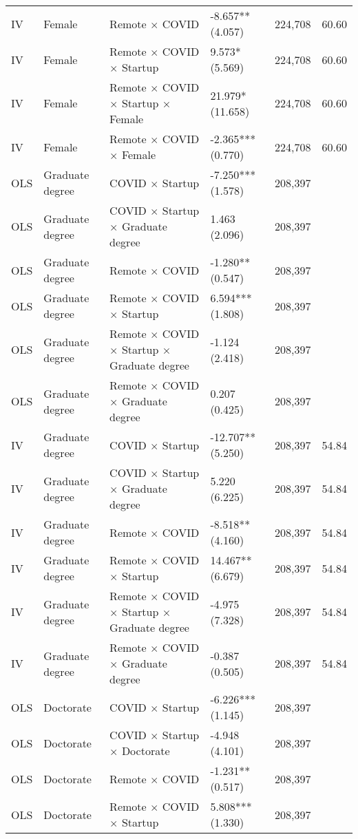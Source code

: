 \documentclass[11pt]{article}
\begin{document}
{\begin{longtable}{llllrr}
IV & Female & Remote $\times$ COVID & -8.657** (4.057) & 224,708 & 60.60 \\
IV & Female & Remote $\times$ COVID $\times$ Startup &  9.573* (5.569) & 224,708 & 60.60 \\
IV & Female & Remote $\times$ COVID $\times$ Startup × Female &  21.979* (11.658) & 224,708 & 60.60 \\
IV & Female & Remote $\times$ COVID × Female & -2.365*** (0.770) & 224,708 & 60.60 \\
OLS & Graduate degree & COVID $\times$ Startup & -7.250*** (1.578) & 208,397 &  \\
OLS & Graduate degree & COVID $\times$ Startup × Graduate degree &  1.463 (2.096) & 208,397 &  \\
OLS & Graduate degree & Remote $\times$ COVID & -1.280** (0.547) & 208,397 &  \\
OLS & Graduate degree & Remote $\times$ COVID $\times$ Startup &  6.594*** (1.808) & 208,397 &  \\
OLS & Graduate degree & Remote $\times$ COVID $\times$ Startup × Graduate degree & -1.124 (2.418) & 208,397 &  \\
OLS & Graduate degree & Remote $\times$ COVID × Graduate degree &  0.207 (0.425) & 208,397 &  \\
IV & Graduate degree & COVID $\times$ Startup & -12.707** (5.250) & 208,397 & 54.84 \\
IV & Graduate degree & COVID $\times$ Startup × Graduate degree &  5.220 (6.225) & 208,397 & 54.84 \\
IV & Graduate degree & Remote $\times$ COVID & -8.518** (4.160) & 208,397 & 54.84 \\
IV & Graduate degree & Remote $\times$ COVID $\times$ Startup &  14.467** (6.679) & 208,397 & 54.84 \\
IV & Graduate degree & Remote $\times$ COVID $\times$ Startup × Graduate degree & -4.975 (7.328) & 208,397 & 54.84 \\
IV & Graduate degree & Remote $\times$ COVID × Graduate degree & -0.387 (0.505) & 208,397 & 54.84 \\
OLS & Doctorate & COVID $\times$ Startup & -6.226*** (1.145) & 208,397 &  \\
OLS & Doctorate & COVID $\times$ Startup × Doctorate & -4.948 (4.101) & 208,397 &  \\
OLS & Doctorate & Remote $\times$ COVID & -1.231** (0.517) & 208,397 &  \\
OLS & Doctorate & Remote $\times$ COVID $\times$ Startup &  5.808*** (1.330) & 208,397 &  \\

\end{longtable}}
\end{document}
